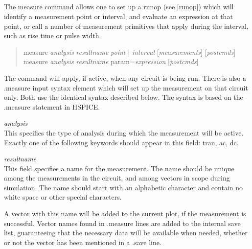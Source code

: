 \subsection{}


The {\cb measure} command allows one to set up a runop (see
\ref{runop}) which will identify a measurement point or interval, and
evaluate an expression at that point, or call a number of measurement
primitives that apply during the interval, such as rise time or pulse
width.

\begin{quote}
measure {\it analysis} {\it resultname} {\it point} | {\it interval}
[{\it measurements\/}] [{\it postcmds\/}]\\
measure {\it analysis} {\it resultname} param={\it expression}
[{\it postcmds\/}]
\end{quote}

The command will apply, if active, when any circuit is being run. 
There is also a {\vt .measure} input syntax element which will set up
the measurement on that circuit only.  Both use the identical syntax
described below.  The syntax is based on the {\vt .measure} statement
in HSPICE.

\begin{description}
\item{\it analysis}\\
This specifies the type of analysis during which the measurement will
be active.  Exactly one of the following keywords should appear in
this field:  {\vt tran}, {\vt ac}, {\vt dc}.

\item{\it resultname}\\
This field specifies a name for the measurement.  The name should be
unique among the measurements in the circuit, and among vectors in
scope during simulation.  The name should start with an alphabetic
character and contain no white space or other special characters.
\end{description}

A vector with this name will be added to the current plot, if the
measurement is successful.  Vector names found in {\vt .measure} lines
are added to the internal save list, guaranteeing that the necessary
data will be available when needed, whether or not the vector has been
mentioned in a {\vt .save} line.

